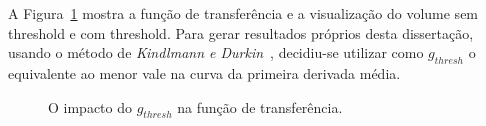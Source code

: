 	A Figura~\ref{fig:g_res_thresh} mostra a função de transferência e a visualização do volume  sem threshold e com threshold. Para gerar resultados próprios desta dissertação, usando o método de \textit{Kindlmann e Durkin}~\cite{gordon}, decidiu-se utilizar como $ g_{thresh} $ o equivalente ao menor vale na curva da primeira derivada média.
	
\begin{figure}[h]
	\centering
	\caption{O impacto do $g_{thresh}$ na função de transferência.}
	\label{fig:g_res_thresh}
\end{figure}
	
